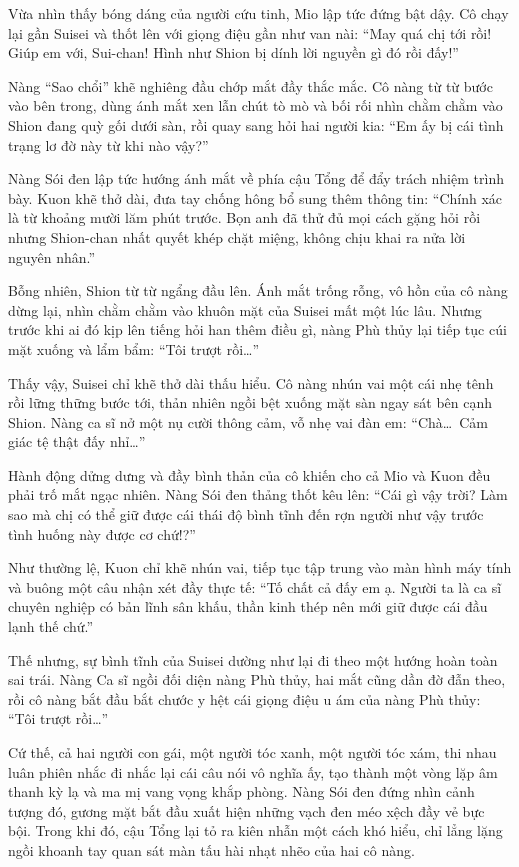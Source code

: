 \documentclass[../main.tex]{subfiles}
\begin{document}
Vừa nhìn thấy bóng dáng của người cứu tinh, Mio lập tức đứng bật dậy. Cô chạy lại gần Suisei và thốt lên với giọng điệu gần như van nài: ``May quá chị tới rồi! Giúp em với, Sui-chan! Hình như Shion bị dính lời nguyền gì đó rồi đấy!''

Nàng ``Sao chổi'' khẽ nghiêng đầu chớp mắt đầy thắc mắc. Cô nàng từ từ bước vào bên trong, dùng ánh mắt xen lẫn chút tò mò và bối rối nhìn chằm chằm vào Shion đang quỳ gối dưới sàn, rồi quay sang hỏi hai người kia: ``Em ấy bị cái tình trạng lơ đờ này từ khi nào vậy?''

Nàng Sói đen lập tức hướng ánh mắt về phía cậu Tổng để đẩy trách nhiệm trình bày. Kuon khẽ thở dài, đưa tay chống hông bổ sung thêm thông tin: ``Chính xác là từ khoảng mười lăm phút trước. Bọn anh đã thử đủ mọi cách gặng hỏi rồi nhưng Shion-chan nhất quyết khép chặt miệng, không chịu khai ra nửa lời nguyên nhân.''

Bỗng nhiên, Shion từ từ ngẩng đầu lên. Ánh mắt trống rỗng, vô hồn của cô nàng dừng lại, nhìn chằm chằm vào khuôn mặt của Suisei mất một lúc lâu. Nhưng trước khi ai đó kịp lên tiếng hỏi han thêm điều gì, nàng Phù thủy lại tiếp tục cúi mặt xuống và lẩm bẩm: ``Tôi trượt rồi\dots''

Thấy vậy, Suisei chỉ khẽ thở dài thấu hiểu. Cô nàng nhún vai một cái nhẹ tênh rồi lững thững bước tới, thản nhiên ngồi bệt xuống mặt sàn ngay sát bên cạnh Shion. Nàng ca sĩ nở một nụ cười thông cảm, vỗ nhẹ vai đàn em: ``Chà\dots\ Cảm giác tệ thật đấy nhỉ\dots''

Hành động dửng dưng và đầy bình thản của cô khiến cho cả Mio và Kuon đều phải trố mắt ngạc nhiên. Nàng Sói đen thảng thốt kêu lên: ``Cái gì vậy trời? Làm sao mà chị có thể giữ được cái thái độ bình tĩnh đến rợn người như vậy trước tình huống này được cơ chứ!?''

Như thường lệ, Kuon chỉ khẽ nhún vai, tiếp tục tập trung vào màn hình máy tính và buông một câu nhận xét đầy thực tế: ``Tố chất cả đấy em ạ. Người ta là ca sĩ chuyên nghiệp có bản lĩnh sân khấu, thần kinh thép nên mới giữ được cái đầu lạnh thế chứ.''


Thế nhưng, sự bình tĩnh của Suisei dường như lại đi theo một hướng hoàn toàn sai trái. Nàng Ca sĩ ngồi đối diện nàng Phù thủy, hai mắt cũng dần đờ đẫn theo, rồi cô nàng bắt đầu bắt chước y hệt cái giọng điệu u ám của nàng Phù thủy: ``Tôi trượt rồi\dots''

Cứ thế, cả hai người con gái, một người tóc xanh, một người tóc xám, thi nhau luân phiên nhắc đi nhắc lại cái câu nói vô nghĩa ấy, tạo thành một vòng lặp âm thanh kỳ lạ và ma mị vang vọng khắp phòng. Nàng Sói đen đứng nhìn cảnh tượng đó, gương mặt bắt đầu xuất hiện những vạch đen méo xệch đầy vẻ bực bội. Trong khi đó, cậu Tổng lại tỏ ra kiên nhẫn một cách khó hiểu, chỉ lẳng lặng ngồi khoanh tay quan sát màn tấu hài nhạt nhẽo của hai cô nàng.
\end{document}
